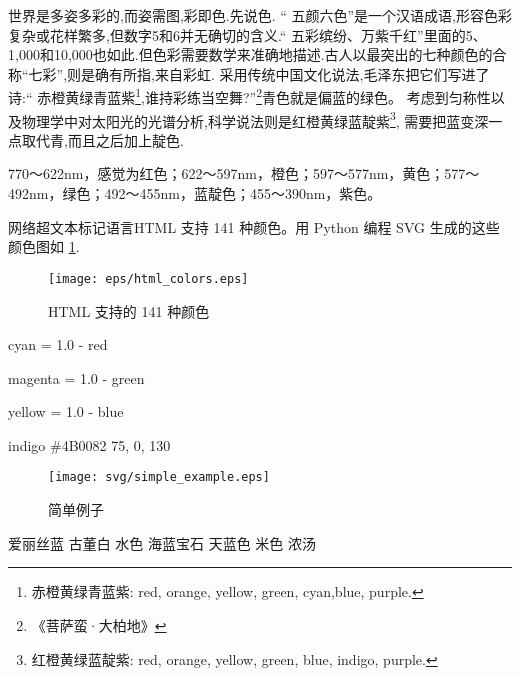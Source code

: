 \documentclass[main.tex]{subfiles}
\begin{document}
世界是多姿多彩的,而姿需图,彩即色.先说色.
“ 五颜六色”是一个汉语成语,形容色彩复杂或花样繁多,但数字5和6并无确切的含义.“ 
五彩缤纷、万紫千红”里面的5、1,000和10,000也如此.但色彩需要数学来准确地描述.古人以最突出的七种颜色的合称“七彩”,则是确有所指,来自彩虹.
采用传统中国文化说法,毛泽东把它们写进了诗:“ 赤橙黄绿青蓝紫\footnote{赤橙黄绿青蓝紫: red, orange, yellow, green, cyan,blue, purple.},谁持彩练当空舞?”\footnote{《菩萨蛮·大柏地》}青色就是偏蓝的绿色。
考虑到匀称性以及物理学中对太阳光的光谱分析,科学说法则是红橙黄绿蓝靛紫\footnote{红橙黄绿蓝靛紫: red, orange, yellow, green, blue, indigo, purple.},
需要把蓝变深一点取代青,而且之后加上靛色.

770～622nm，感觉为红色；622～597nm，橙色；597～577nm，黄色；577～492nm，绿色；492～455nm，蓝靛色；455～390nm，紫色。

网络超文本标记语言HTML 支持 141 种颜色。用 Python 编程 SVG 生成的这些颜色图如 \ref{fig:1.4.2}.

\begin{figure}
	\centering
	\texttt{[image: eps/html\_colors.eps]}
	\caption{HTML 支持的 141 种颜色}
	\label{fig:1.4.2}
\end{figure}
cyan = 1.0 - red

magenta = 1.0 - green

yellow = 1.0 - blue

indigo \#4B0082 75, 0, 130

\begin{figure}
	\centering
	\texttt{[image: svg/simple\_example.eps]}
	\caption{简单例子}
	\label{fig:I.1.}
\end{figure}



爱丽丝蓝%
古董白%
水色%
海蓝宝石%
天蓝色%
米色%
浓汤%
\end{document}
